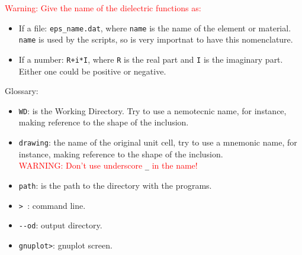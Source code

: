 \documentclass[preprint,12pt]{revtex4}
\begin{document}
\textcolor{red}{Warning: Give the name of the dielectric functions
  as:}
\begin{itemize}
\item If a file: \verb=eps_name.dat=, where
 \verb=name= is the name of the element or material. \verb=name= is
 used by the scripts, so is very importnat to have this nomenclature. 
\item If a number: \verb=R+i*I=, where
 \verb=R= is the real part and \verb=I= is the imaginary part. Either
 one could be positive or negative.
\end{itemize}
Glossary:
\begin{itemize}
\item \verb=WD=: is the Working Directory. 
Try to use a nemotecnic
  name, for instance, making reference to the shape of the inclusion.  
\item 
\verb=drawing=: the name of the original unit cell,
try to use a   mnemonic
  name, for instance, making reference to the shape of the
  inclusion.\\
\textcolor{red}{WARNING: Don't use underscore} \verb=_=
\textcolor{red}{in the name!}

\item \verb=path=: is the path to the directory with the programs.
\item \verb=> =: command line.
\item \verb=--od=: output directory.
\item  \verb=gnuplot>=: gnuplot screen.
\end{itemize}
\end{document}

